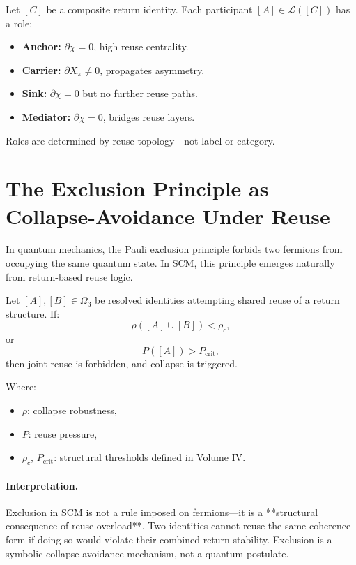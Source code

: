 Let $[C]$ be a composite return identity. Each participant $[A] \in \mathcal{L}([C])$ has a role:

\begin{itemize}
  \item \textbf{Anchor:} $\partial \chi = 0$, high reuse centrality.
  \item \textbf{Carrier:} $\partial X_\pi \neq 0$, propagates asymmetry.
  \item \textbf{Sink:} $\partial \chi = 0$ but no further reuse paths.
  \item \textbf{Mediator:} $\partial \chi = 0$, bridges reuse layers.
\end{itemize}

Roles are determined by reuse topology—not label or category.

\section{The Exclusion Principle as Collapse-Avoidance Under Reuse} \label{sec:exclusion-scm}

In quantum mechanics, the Pauli exclusion principle forbids two fermions from occupying the same quantum state. In SCM, this principle emerges naturally from return-based reuse logic.

\begin{definition}
Let $[A], [B] \in \Omega_3$ be resolved identities attempting shared reuse of a return structure. If:
\[
\rho([A] \cup [B]) < \rho_c,
\]
or
\[
P([A]) > P_{\text{crit}},
\]
then joint reuse is forbidden, and collapse is triggered.
\end{definition}

\noindent Where:
\begin{itemize}
    \item $\rho$: collapse robustness,
    \item $P$: reuse pressure,
    \item $\rho_c$, $P_{\text{crit}}$: structural thresholds defined in Volume IV.
\end{itemize}

\paragraph{Interpretation.}
Exclusion in SCM is not a rule imposed on fermions—it is a **structural consequence of reuse overload**. Two identities cannot reuse the same coherence form if doing so would violate their combined return stability. Exclusion is a symbolic collapse-avoidance mechanism, not a quantum postulate.

